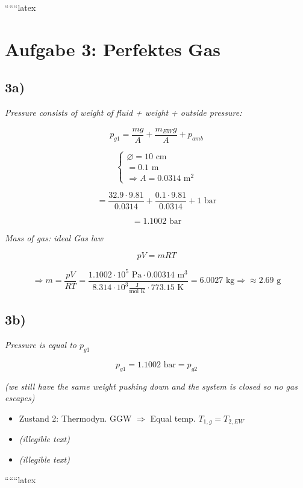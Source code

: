 
``````latex


\section*{Aufgabe 3: Perfektes Gas}

\subsection*{3a)}

\textit{Pressure consists of weight of fluid + weight + outside pressure:}

\[
p_{g1} = \frac{mg}{A} + \frac{m_{EW}g}{A} + p_{amb}
\]

\[
\begin{cases}
\varnothing = 10 \text{ cm} \\
= 0.1 \text{ m} \\
\Rightarrow A = 0.0314 \text{ m}^2
\end{cases}
\]

\[
= \frac{32.9 \cdot 9.81}{0.0314} + \frac{0.1 \cdot 9.81}{0.0314} + 1 \text{ bar}
\]

\[
= 1.1002 \text{ bar}
\]

\textit{Mass of gas: ideal Gas law}

\[
pV = mRT
\]

\[
\Rightarrow m = \frac{pV}{RT} = \frac{1.1002 \cdot 10^5 \text{ Pa} \cdot 0.00314 \text{ m}^3}{8.314 \cdot 10^3 \frac{\text{J}}{\text{mol K}} \cdot 773.15 \text{ K}} = 6.0027 \text{ kg} \Rightarrow \approx 2.69 \text{ g}
\]

\subsection*{3b)}

\textit{Pressure is equal to $p_{g1}$}

\[
p_{g1} = 1.1002 \text{ bar} = p_{g2}
\]

\textit{(we still have the same weight pushing down and the system is closed so no gas escapes)}

\begin{itemize}
    \item Zustand 2: Thermodyn. GGW $\Rightarrow$ Equal temp. $T_{1,g} = T_{2,EW}$
    \item \textit{(illegible text)}
    \item \textit{(illegible text)}
\end{itemize}

``````latex


